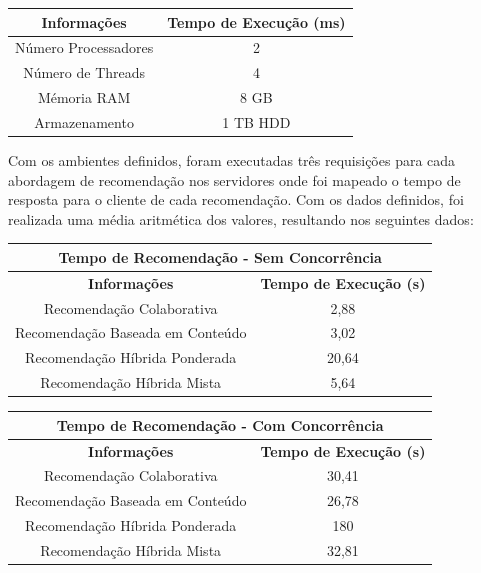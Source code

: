 \begin{table}[H]
\centering
\begin{tabular}{|c|c|}
\hline
\textbf{Informações} & \textbf{Tempo de Execução (ms)} \\ \hline
Número Processadores & 2                               \\ \hline
Número de Threads    & 4                               \\ \hline
Mémoria RAM          & 8 GB                            \\ \hline
Armazenamento        & 1 TB HDD                        \\ \hline
\end{tabular}
\end{table}

Com os ambientes definidos, foram executadas três requisições para cada abordagem de recomendação nos servidores onde foi mapeado o tempo de resposta para o cliente de cada recomendação. Com os dados definidos, foi realizada uma média aritmética dos valores, resultando nos seguintes dados:

\begin{table}[H]
\centering
\begin{tabular}{|c|c|}
\hline
\multicolumn{2}{|c|}{\textbf{Tempo de Recomendação - Sem Concorrência}} \\ \hline
\textbf{Informações}                 & \textbf{Tempo de Execução (s)}    \\ \hline
Recomendação Colaborativa            & 2,88                               \\ \hline
Recomendação Baseada em Conteúdo     & 3,02                               \\ \hline
Recomendação Híbrida Ponderada       & 20,64                              \\ \hline
Recomendação Híbrida Mista           & 5,64                               \\ \hline
\end{tabular}
\end{table}

\begin{table}[H]
\centering
\begin{tabular}{|c|c|}
\hline
\multicolumn{2}{|c|}{\textbf{Tempo de Recomendação - Com Concorrência}} \\ \hline
\textbf{Informações}                 & \textbf{Tempo de Execução (s)}    \\ \hline
Recomendação Colaborativa            & 30,41                              \\ \hline
Recomendação Baseada em Conteúdo     & 26,78                               \\ \hline
Recomendação Híbrida Ponderada       & 180                              \\ \hline
Recomendação Híbrida Mista           & 32,81                              \\ \hline
\end{tabular}
\end{table}

